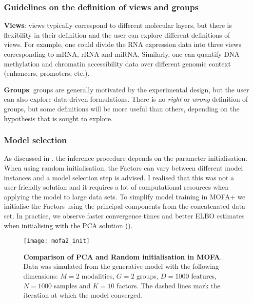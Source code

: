 \subsubsection{Guidelines on the definition of views and groups} \label{section:mofa2_guidelines_views_groups}

\textbf{Views}: views typically correspond to different molecular layers, but there is flexibility in their definition and the user can explore different definitions of views. For example, one could divide the RNA expression data into three views corresponding to mRNA, rRNA and miRNA. Similarly, one can quantify DNA methylation and chromatin accessibility data over different genomic context (enhancers, promoters, etc.).

\textbf{Groups}: groups are generally motivated by the experimental design, but the user can also explore data-driven formulations. There is no \textit{right} or \textit{wrong} definition of groups, but some definitions will be more useful than others, depending on the hypothesis that is sought to explore.

\subsubsection{Model selection} \label{section:mofa2_model_selection}

As discussed in , the inference procedure depends on the parameter initialisation. When using random initialisation, the Factors can vary between different model instances and a model selection step is advised. I realised that this was not a user-friendly solution and it requires a lot of computational resources when applying the model to large data sets. To simplify model training in MOFA+ we initialise the Factors using the principal components from the concatenated data set. In practice, we observe faster convergence times and better ELBO estimates when initialising with the PCA solution ().

\begin{figure}[H]
	\centering
	\texttt{[image: mofa2\_init]}
	\caption[]{
	\textbf{Comparison of PCA and Random initialisation in MOFA}.\\ Data was simulated from the generative model with the following dimensions: $M=2$ modalities, $G=2$ groups, $D=1000$ features, $N=1000$ samples and $K=10$ factors. The dashed lines mark the iteration at which the model converged.
	}
	\label{fig:mofa2_init}
\end{figure}

